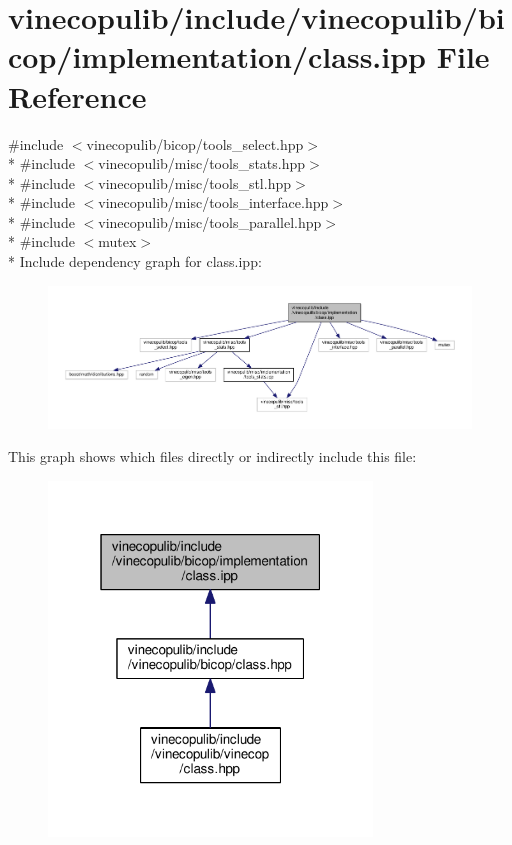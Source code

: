 \hypertarget{bicop_2implementation_2class_8ipp}{}\section{vinecopulib/include/vinecopulib/bicop/implementation/class.ipp File Reference}
\label{bicop_2implementation_2class_8ipp}
{\ttfamily \#include $<$vinecopulib/bicop/tools\+\_\+select.\+hpp$>$}\\*
{\ttfamily \#include $<$vinecopulib/misc/tools\+\_\+stats.\+hpp$>$}\\*
{\ttfamily \#include $<$vinecopulib/misc/tools\+\_\+stl.\+hpp$>$}\\*
{\ttfamily \#include $<$vinecopulib/misc/tools\+\_\+interface.\+hpp$>$}\\*
{\ttfamily \#include $<$vinecopulib/misc/tools\+\_\+parallel.\+hpp$>$}\\*
{\ttfamily \#include $<$mutex$>$}\\*
Include dependency graph for class.\+ipp\+:
\nopagebreak
\begin{figure}[H]
\begin{center}
\leavevmode
\includegraphics[width=350pt]{bicop_2implementation_2class_8ipp__incl}
\end{center}
\end{figure}
This graph shows which files directly or indirectly include this file\+:
\nopagebreak
\begin{figure}[H]
\begin{center}
\leavevmode
\includegraphics[width=244pt]{bicop_2implementation_2class_8ipp__dep__incl}
\end{center}
\end{figure}
